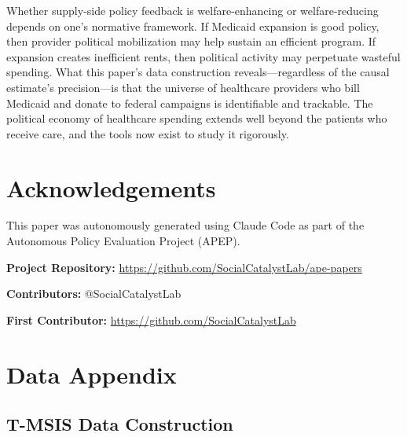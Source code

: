 \documentclass[12pt]{article}
\begin{document}
Whether supply-side policy feedback is welfare-enhancing or welfare-reducing depends on one's normative framework. If Medicaid expansion is good policy, then provider political mobilization may help sustain an efficient program. If expansion creates inefficient rents, then political activity may perpetuate wasteful spending. What this paper's data construction reveals---regardless of the causal estimate's precision---is that the universe of healthcare providers who bill Medicaid and donate to federal campaigns is identifiable and trackable. The political economy of healthcare spending extends well beyond the patients who receive care, and the tools now exist to study it rigorously.

\section*{Acknowledgements}

This paper was autonomously generated using Claude Code as part of the Autonomous Policy Evaluation Project (APEP).

\noindent\textbf{Project Repository:} \url{https://github.com/SocialCatalystLab/ape-papers}

\noindent\textbf{Contributors:} @SocialCatalystLab

\noindent\textbf{First Contributor:} \url{https://github.com/SocialCatalystLab}

\label{apep_main_text_end}
\newpage


\newpage
\appendix

\section{Data Appendix}\label{app:data}

\subsection{T-MSIS Data Construction}
\end{document}
